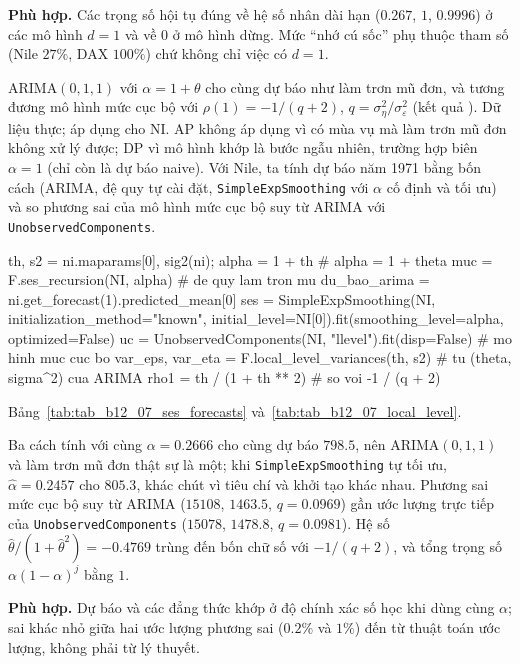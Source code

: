  \textbf{Phù hợp.} Các trọng số hội tụ đúng về hệ số nhân dài hạn ($0.267$, $1$, $0.9996$) ở các mô hình $d=1$ và về $0$ ở mô hình dừng. Mức ``nhớ cú sốc'' phụ thuộc tham số (Nile $27\%$, DAX $100\%$) chứ không chỉ việc có $d=1$.

 ARIMA$(0,1,1)$ với $\alpha=1+\theta$ cho cùng dự báo như làm trơn mũ đơn, và tương đương mô hình mức cục bộ với $\rho(1)=-1/(q+2)$, $q=\sigma_\eta^2/\sigma_\varepsilon^2$ (kết quả ).
 Dữ liệu thực; áp dụng cho NI. AP không áp dụng vì có mùa vụ mà làm trơn mũ đơn không xử lý được; DP vì mô hình khớp là bước ngẫu nhiên, trường hợp biên $\alpha=1$ (chỉ còn là dự báo naive). Với Nile, ta tính dự báo năm 1971 bằng bốn cách (ARIMA, đệ quy tự cài đặt, \texttt{SimpleExpSmoothing} với $\alpha$ cố định và tối ưu) và so phương sai của mô hình mức cục bộ suy từ ARIMA với \texttt{UnobservedComponents}.
\begin{codeblock}
th, s2 = ni.maparams[0], sig2(ni); alpha = 1 + th                # alpha = 1 + theta
muc = F.ses_recursion(NI, alpha)                                 # de quy lam tron mu
du_bao_arima = ni.get_forecast(1).predicted_mean[0]
ses = SimpleExpSmoothing(NI, initialization_method="known",
                         initial_level=NI[0]).fit(smoothing_level=alpha, optimized=False)
uc = UnobservedComponents(NI, "llevel").fit(disp=False)          # mo hinh muc cuc bo
var_eps, var_eta = F.local_level_variances(th, s2)               # tu (theta, sigma^2) cua ARIMA
rho1 = th / (1 + th ** 2)                                        # so voi -1 / (q + 2)
\end{codeblock}
 Bảng~\ref{tab:tab_b12_07_ses_forecasts} và~\ref{tab:tab_b12_07_local_level}.


 Ba cách tính với cùng $\alpha=0.2666$ cho cùng dự báo $798.5$, nên ARIMA$(0,1,1)$ và làm trơn mũ đơn thật sự là một; khi \texttt{SimpleExpSmoothing} tự tối ưu, $\hat\alpha=0.2457$ cho $805.3$, khác chút vì tiêu chí và khởi tạo khác nhau. Phương sai mức cục bộ suy từ ARIMA ($15108$, $1463.5$, $q=0.0969$) gần ước lượng trực tiếp của \texttt{UnobservedComponents} ($15078$, $1478.8$, $q=0.0981$). Hệ số $\hat\theta/(1+\hat\theta^2)=-0.4769$ trùng đến bốn chữ số với $-1/(q+2)$, và tổng trọng số $\alpha(1-\alpha)^j$ bằng $1$.

 \textbf{Phù hợp.} Dự báo và các đẳng thức khớp ở độ chính xác số học khi dùng cùng $\alpha$; sai khác nhỏ giữa hai ước lượng phương sai ($0.2\%$ và $1\%$) đến từ thuật toán ước lượng, không phải từ lý thuyết.

